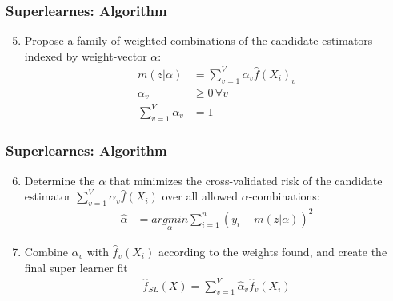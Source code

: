 \documentclass[
  shownotes,
  xcolor={svgnames},
  hyperref={colorlinks,citecolor=DarkBlue,linkcolor=DarkRed,urlcolor=DarkBlue}
  , aspectratio=169]{beamer}
\begin{document}
\begin{frame}[fragile]
\frametitle{Superlearnes: Algorithm}


 
 \begin{enumerate}
 \setcounter{enumi}{4}
 \item Propose a family of weighted combinations of the candidate estimators indexed by weight-vector $\alpha$:
 \medskip
 \begin{align}
  m(z|\alpha) &= \sum_{v=1}^V \alpha_v \hat{f}(X_i)_v \\ \nonumber
  \alpha_v &\geq 0 \, \forall v \\ 
\sum_{v=1}^V \alpha_v &=1 \nonumber
 \end{align}
\end{enumerate}
\end{frame}

\begin{frame}[fragile]
\frametitle{Superlearnes: Algorithm}



 \begin{enumerate}
   \setcounter{enumi}{5}
   \item Determine the $\alpha$ that minimizes the cross-validated risk of the candidate estimator $\sum_{v=1}^V \alpha_v \hat{f}(X_i)$ over all allowed $\alpha$-combinations:
   \begin{align}
    \hat{\alpha} &=\underset{\alpha}{argmin}\sum_{i=1}^n (y_i - m(z|\alpha))^2
   \end{align}

   \medskip

    \item Combine $\hat{\alpha}_v$ with $\hat{f}_v(X_i)$  according to the weights found, and create the final super learner fit
    \begin{align}
    \hat{f}_{SL}(X) = \sum_{v=1}^V \hat{\alpha}_v\hat{f}_v(X_i) 
    \end{align}
\end{enumerate}

\end{frame}
\end{document}
